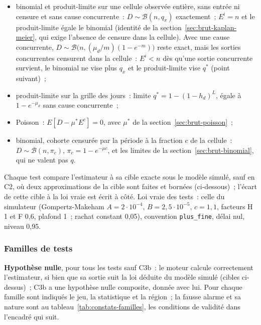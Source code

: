 \documentclass[a4paper,11pt]{article}
\newcommand{\code}[1]{\texttt{\small #1}}
\begin{document}
\begin{itemize}[leftmargin=*, itemsep=2pt]
  \item binomial et produit-limite sur une cellule observée entière, sans
    entrée ni censure et sans cause concurrente~: $D \sim \mathcal{B}(n,
    q_x)$ exactement~; $E^i = n$ et le produit-limite égale le binomial
    (identité de la section~\ref{sec:brut-kaplan-meier}, qui exige l'absence
    de censure dans la cellule). Avec une cause concurrente, $D \sim
    \mathcal{B}\bigl(n, (\mu_d/m)(1 - e^{-m})\bigr)$ reste exact, mais les
    sorties concurrentes censurent dans la cellule~: $E^i < n$ dès qu'une
    sortie concurrente survient, le binomial ne
    vise plus $q_x$ et le produit-limite vise $q^{*}$ (point suivant)~;
  \item produit-limite sur la grille des jours~: limite $q^{*} = 1 - (1 -
    h_d)^L$, égale à $1 - e^{-\mu_d}$ sans cause concurrente~;
  \item Poisson~: $E[D - \mu^{*} E^c] = 0$, avec $\mu^{*}$ de la
    section~\ref{sec:brut-poisson}~;
  \item binomial, cohorte censurée par la période à la fraction $c$ de la
    cellule~: $D \sim \mathcal{B}(n, \pi_c)$, $\pi_c = 1 - e^{-\mu c}$, et les
    limites de la section~\ref{sec:brut-binomial}, qui ne valent pas $q$.
\end{itemize}

\noindent
Chaque test compare l'estimateur à sa cible exacte sous le modèle simulé,
sauf en C2, où deux approximations de la cible sont faites et bornées
(ci-dessous)~; l'écart de cette cible à la loi vraie est écrit à côté. Loi vraie des tests~:
celle du simulateur (Gompertz-Makeham $A = 2 \cdot 10^{-4}$, $B = 2{,}5
\cdot 10^{-5}$, $c = 1{,}1$, facteurs H 1 et F 0,6, plafond 1~; rachat
constant 0,05), convention \code{plus\_fine}, délai nul, niveau 0,95.

\subsubsection*{Familles de tests}

\textbf{Hypothèse nulle}, pour tous les tests sauf C3b~: le moteur calcule
correctement l'estimateur, si bien que sa sortie suit la loi déduite du
modèle simulé (cibles ci-dessus)~; C3b a une hypothèse nulle composite,
donnée avec lui. Pour chaque famille sont indiqués le jeu, la statistique et
la région~; la fausse alarme et sa nature sont au
tableau~\ref{tab:constats-familles}, les conditions de validité dans
l'encadré qui suit.
\end{document}
